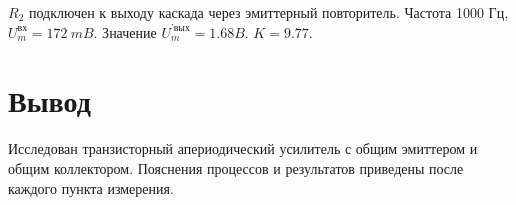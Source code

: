 $R_2$ подключен к выходу каскада через эмиттерный повторитель. Частота 1000 Гц, $U_m^{\text{вх}} = 172~ mB$. Значение $U_m^{\text{'вых}} = 1.68 B$. $K=9.77$.

\section{Вывод}
Исследован транзисторный апериодический усилитель с общим эмиттером и общим коллектором. Пояснения процессов и результатов приведены после каждого пункта измерения. 




